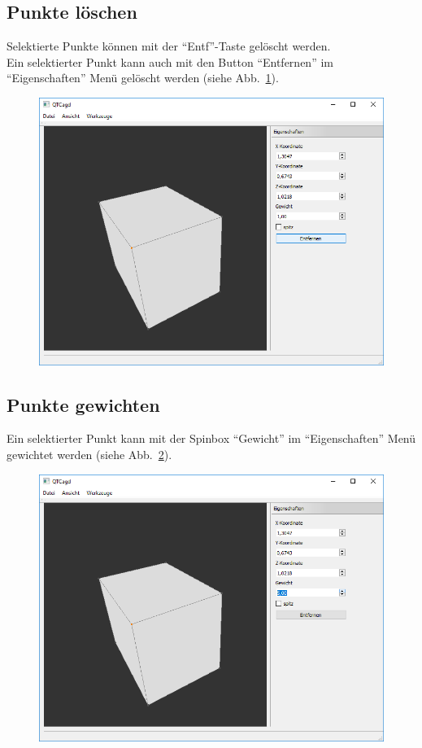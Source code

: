\subsection{Punkte löschen}
Selektierte Punkte können mit der "`Entf"'-Taste  gelöscht werden.\\
Ein selektierter Punkt kann auch mit den Button "`Entfernen"' im "`Eigenschaften"' Menü gelöscht werden (siehe Abb.~\ref{fig:PunkteLoeschen}).

\begin{figure}[H]
	\centering
	\includegraphics[scale=0.5]{content/pictures/5-PunkteLoeschen}
	\caption{}
	\label{fig:PunkteLoeschen}	
\end{figure}

\subsection{Punkte gewichten}
Ein selektierter Punkt kann mit der Spinbox "`Gewicht"' im "`Eigenschaften"' Menü gewichtet werden (siehe Abb.~\ref{fig:PunkteGewichten}).

\begin{figure}[H]
	\centering
	\includegraphics[scale=0.5]{content/pictures/6-PunkteGewichten}
	\caption{}
	\label{fig:PunkteGewichten}
\end{figure}

